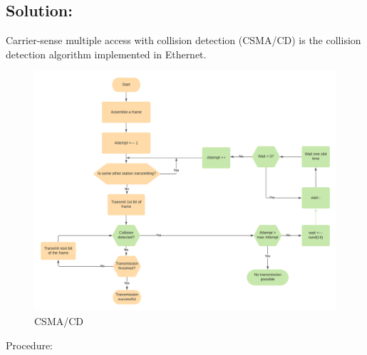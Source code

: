 \documentclass{resources/WeSTassignment}
\begin{document}
\subsection{Solution:}
Carrier-sense multiple access with collision detection (CSMA/CD) is the collision detection algorithm implemented in Ethernet.
\begin{figure}[htbp]
\centerline{\includegraphics[scale=.2]{./resources/CSMACD.png}}
\caption{CSMA/CD}
\label{fig}
\end{figure}
Procedure:
\end{document}
